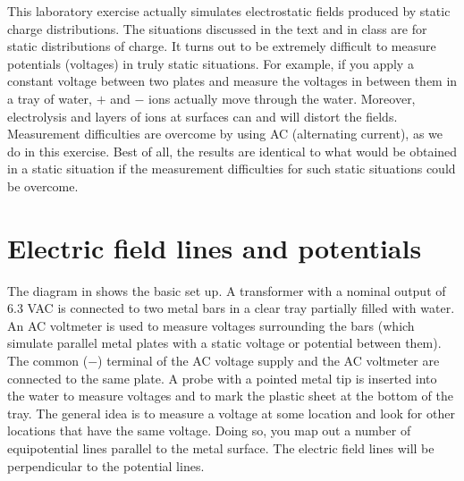 \begin{multicols}{2}
This laboratory exercise actually simulates electrostatic fields produced by static charge distributions.  The situations discussed in the text and in class are for static distributions of charge.  It turns out to be extremely difficult to measure potentials (voltages) in truly static situations.  For example, if you apply a constant voltage between two plates and measure the voltages in between them in a tray of water, $+$ and $-$ ions actually move through the water.  Moreover, electrolysis and layers of ions at surfaces can and will distort the fields.  Measurement difficulties are overcome by using AC (alternating current), as we do in this exercise.  Best of all, the results are identical to what would be obtained in a static situation if the measurement difficulties for such static situations could be overcome.

\section{Electric field lines and potentials}
The diagram in  shows the basic set up.  A transformer with a nominal output of 6.3 VAC is connected to two metal bars in a clear tray partially filled with water.  An AC voltmeter is used to measure voltages surrounding the bars (which simulate parallel metal plates with a static voltage or potential between them).  The common ($-$) terminal of the AC voltage supply and the AC voltmeter are connected to the same plate.  A probe with a pointed metal tip is inserted into the water to measure voltages and to mark the plastic sheet at the bottom of the tray.  The general idea is to measure a voltage at some location and look for other locations that have the same voltage.  Doing so, you map out a number of equipotential lines parallel to the metal surface. The electric field lines will be perpendicular to the potential lines.


\end{multicols}
